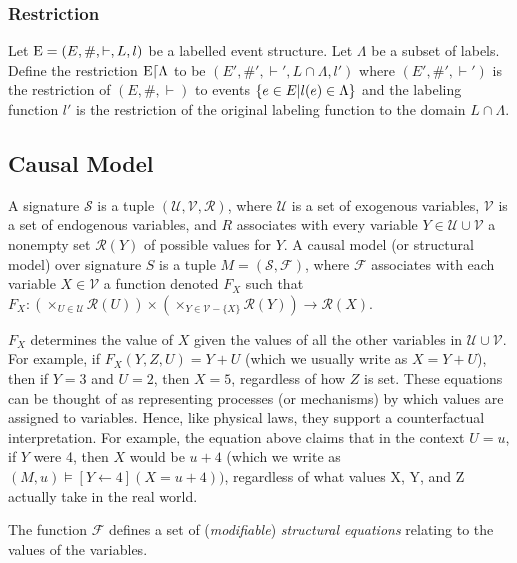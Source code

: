 \subsubsection{Restriction}

\begin{definition}[Restriction]
    Let $\mathrm{E} = (E,\#,\vdash,L,l)$ be a labelled event structure.
    Let $\Lambda$ be a subset of labels.
    Define the restriction $\mathrm{E}\lceil \Lambda$ to be $(E',\#',\vdash',L\cap \Lambda,l')$
    where $(E',\#',\vdash')$ is the restriction of $(E,\#,\vdash)$
    to events $\{e \in E|l(e) \in \Lambda\}$ and the labeling function $l'$
    is the restriction of the original labeling function to the domain $L \cap \Lambda$.
\end{definition}

\subsection{Causal Model \cite{hp}}
A signature $\mathcal{S}$ is a tuple $(\mathcal{U},\mathcal{V},\mathcal{R})$,
where $\mathcal{U}$ is a set of exogenous variables, $\mathcal{V}$
is a set of endogenous variables, and $R$ associates with every variable
$Y\in \mathcal{U}\cup \mathcal{V}$ a nonempty set $\mathcal{R}(Y)$ of possible values for $Y$.
A causal model (or structural model) over signature $S$ is a tuple
$M=(\mathcal{S},\mathcal{F})$, where $\mathcal{F}$ associates with
each variable $X \in \mathcal{V}$ a function denoted $F_X$ such that
$F_X: (\times_{U\in \mathcal{U}}\mathcal{R}(U))\times (\times_{Y\in\mathcal{V}-\{X\}}\mathcal{R}(Y))\rightarrow \mathcal{R}(X)$.

$F_X$ determines the value of $X$ given the values of all the other variables
in $\mathcal{U}\cup \mathcal{V}$.
For example, if $F_X(Y,Z,U)=Y+U$ (which we usually write as $X = Y + U$),
then if $Y=3$ and $U=2$, then $X = 5$, regardless of how $Z$ is set.
These equations can be thought of as representing processes (or mechanisms) by which values are assigned to variables. Hence, like physical laws, they support a counterfactual interpretation.
For example, the equation above claims that in the context $U=u$, if $Y$ were 4, then $X$ would be $u+4$ (which we write as $(M,u) \models [Y\leftarrow 4](X = u + 4))$, regardless of what values X, Y, and Z actually take in the real world.


The function $\mathcal{F}$ defines a set of (\textit{modifiable}) \textit{structural equations} relating to the values of the variables.

